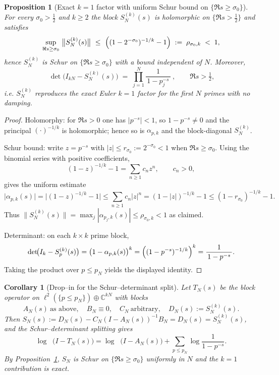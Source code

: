 \documentclass[11pt]{article}
\newtheorem{proposition}[theorem]{Proposition}
\newtheorem{corollary}[theorem]{Corollary}
\theoremstyle{definition}
\theoremstyle{remark}
\newcommand{\C}{\mathbb{C}}
\DeclareMathOperator{\dettwo}{det_2}
\begin{document}
\begin{proposition}[Exact $k=1$ factor with uniform Schur bound on $\{\Re s\ge \sigma_0\}$]
\label{prop:kfold}
For every $\sigma_0>\tfrac12$ and $k\ge 2$ the block $S_{N}^{(k)}(s)$ is holomorphic on $\{\Re s>\tfrac12\}$ and satisfies
\[
 \sup_{\Re s\ge \sigma_0}\ \bigl\|S_{N}^{(k)}(s)\bigr\|\ \le\ \Bigl((1-2^{-\sigma_0})^{-1/k}-1\Bigr)\;:=\;\rho_{\sigma_0,k}\;<\;1,
\]
hence $S_{N}^{(k)}$ is Schur on $\{\Re s\ge \sigma_0\}$ with a bound independent of $N$. Moreover,
\[
 \boxed{\ \det\!\bigl(I_{kN}-S_{N}^{(k)}(s)\bigr)\;=\;\prod_{j=1}^{N}\frac{1}{\,1-p_j^{-s}\,}\ },\qquad \Re s>\tfrac12,
\]
i.e. $S_{N}^{(k)}$ reproduces the exact Euler $k=1$ factor for the first $N$ primes with no damping.
\end{proposition}

\begin{proof}
Holomorphy: for $\Re s>0$ one has $|p^{-s}|<1$, so $1-p^{-s}\neq 0$ and the principal $(\cdot)^{-1/k}$ is holomorphic; hence so is $\alpha_{p,k}$ and the block-diagonal $S_{N}^{(k)}$.

Schur bound: write $z=p^{-s}$ with $|z|\le r_{\sigma_0}:=2^{-\sigma_0}<1$ when $\Re s\ge \sigma_0$. Using the binomial series with positive coefficients,
\[
 (1-z)^{-1/k}-1=\sum_{n\ge 1} c_n z^n,\qquad c_n>0,
\]
gives the uniform estimate
\[
 \bigl|\alpha_{p,k}(s)\bigr|=\bigl|(1-z)^{-1/k}-1\bigr|\le \sum_{n\ge 1} c_n |z|^n
= (1-|z|)^{-1/k}-1 \le (1-r_{\sigma_0})^{-1/k}-1.
\]
Thus $\|S_{N}^{(k)}(s)\|=\max_{j}|\alpha_{p_j,k}(s)|\le \rho_{\sigma_0,k}<1$ as claimed.

Determinant: on each $k\times k$ prime block,
\[
 \det\!\bigl(I_k-S_{p}^{(k)}(s)\bigr)=\bigl(1-\alpha_{p,k}(s)\bigr)^{k}=\Bigl((1-p^{-s})^{-1/k}\Bigr)^{k}=\frac{1}{\,1-p^{-s}\,}.
\]
Taking the product over $p\le p_N$ yields the displayed identity.
\end{proof}

\begin{corollary}[Drop--in for the Schur--determinant split]
\label{cor:dropin}
Let $T_N(s)$ be the block operator on $\ell^2(\{p\le p_N\})\oplus\C^{kN}$ with blocks
\[
 A_N(s)\ \text{as above},\quad B_N\equiv 0,\quad C_N\ \text{arbitrary},\quad D_N(s):=S_{N}^{(k)}(s).
\]
Then $S_N(s):=D_N(s)-C_N(I-A_N(s))^{-1}B_N=D_N(s)=S_{N}^{(k)}(s)$, and the Schur--determinant splitting gives
\[
 \log\dettwo\bigl(I-T_N(s)\bigr)=\log\dettwo\bigl(I-A_N(s)\bigr)+\sum_{p\le p_N}\log\!\frac{1}{1-p^{-s}}.
\]
By Proposition~\ref{prop:kfold}, $S_N$ is Schur on $\{\Re s\ge \sigma_0\}$ uniformly in $N$ and the $k=1$ contribution is exact.
\end{corollary}
\end{document}
